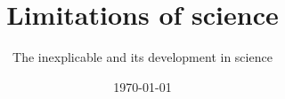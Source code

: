 \documentclass[userip,english,cpalette=Peach]{lecture-fancy-paper}
\title{Limitations of science}%
\subtitle{The inexplicable and its development in science}
\date\today
\begin{document}
\maketitle

\cite{ajzen1991theory}

\blinddocument

\appendix

\printbibliography
\end{document}
